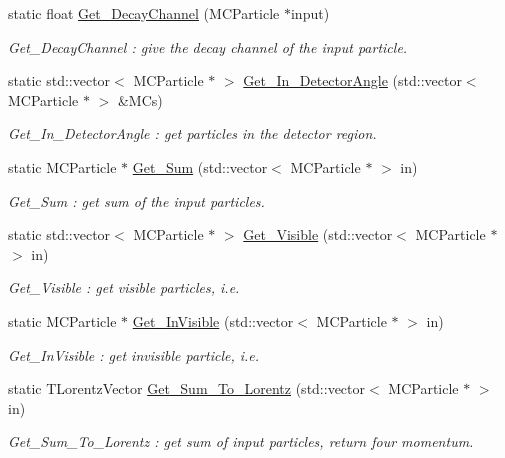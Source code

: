 \begin{DoxyCompactItemize}
static float \hyperlink{classToolSet_1_1CMC_aa16a7d3c1cbd3e1d25cf885b25d561ec}{Get\_\-DecayChannel} (MCParticle $\ast$input)
\begin{DoxyCompactList}\small\item\em Get\_\-DecayChannel : give the decay channel of the input particle. \item\end{DoxyCompactList}\item 
static std::vector$<$ MCParticle $\ast$ $>$ \hyperlink{classToolSet_1_1CMC_a92dc2c0c2bfdaa05ebeebeaf90d4a50a}{Get\_\-In\_\-DetectorAngle} (std::vector$<$ MCParticle $\ast$ $>$ \&MCs)
\begin{DoxyCompactList}\small\item\em Get\_\-In\_\-DetectorAngle : get particles in the detector region. \item\end{DoxyCompactList}\item 
static MCParticle $\ast$ \hyperlink{classToolSet_1_1CMC_a11f6123da1b7a670fc9f22de496affb8}{Get\_\-Sum} (std::vector$<$ MCParticle $\ast$ $>$ in)
\begin{DoxyCompactList}\small\item\em Get\_\-Sum : get sum of the input particles. \item\end{DoxyCompactList}\item 
static std::vector$<$ MCParticle $\ast$ $>$ \hyperlink{classToolSet_1_1CMC_a78794985a367cc765ffca587136c5a6c}{Get\_\-Visible} (std::vector$<$ MCParticle $\ast$ $>$ in)
\begin{DoxyCompactList}\small\item\em Get\_\-Visible : get visible particles, i.e. \item\end{DoxyCompactList}\item 
static MCParticle $\ast$ \hyperlink{classToolSet_1_1CMC_a89441427db18fc75e777966d5ac169b7}{Get\_\-InVisible} (std::vector$<$ MCParticle $\ast$ $>$ in)
\begin{DoxyCompactList}\small\item\em Get\_\-InVisible : get invisible particle, i.e. \item\end{DoxyCompactList}\item 
static TLorentzVector \hyperlink{classToolSet_1_1CMC_a05e74f0cd1f7ceac70fa8d2e38d3a2ab}{Get\_\-Sum\_\-To\_\-Lorentz} (std::vector$<$ MCParticle $\ast$ $>$ in)
\begin{DoxyCompactList}\small\item\em Get\_\-Sum\_\-To\_\-Lorentz : get sum of input particles, return four momentum. \item\end{DoxyCompactList}\item 

\end{DoxyCompactItemize}
